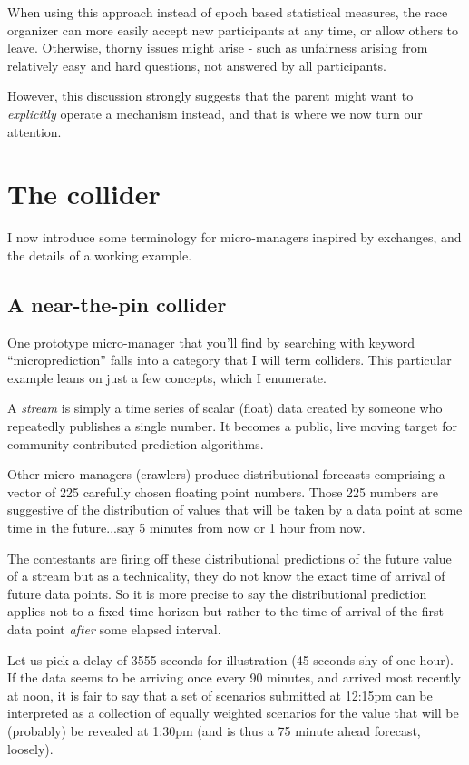 When using this approach instead of epoch based statistical measures, the race organizer can more easily accept new participants at any time, or allow others to leave. Otherwise, thorny issues might arise - such as unfairness arising from relatively easy and hard questions, not answered by all participants.  

However, this discussion strongly suggests that the parent might want to {\em explicitly} operate a mechanism instead, and that is where we now turn our attention. 

\section{The collider}

I now introduce some terminology for micro-managers inspired by exchanges, and the details of a working example.

\subsection{A near-the-pin collider}

One prototype micro-manager that you'll find by searching with keyword ``microprediction'' falls into a category that I will term colliders.
 This particular example leans on just a few concepts, which I enumerate.

A {\em stream} is simply a time series of scalar (float) data created by someone who repeatedly publishes a single number. It becomes a public, live moving target for community contributed prediction algorithms.

Other micro-managers (crawlers) produce distributional forecasts comprising a vector of 225 carefully chosen floating point numbers. Those 225 numbers are suggestive of the distribution of values that will be taken by a data point at some time in the future...say 5 minutes from now or 1 hour from now.

The contestants are firing off these distributional predictions of the future value of a stream but as a technicality, they do not know the exact time of arrival of future data points. So it is more precise to say the distributional prediction applies not to a fixed time horizon but rather to the time of arrival of the first data point {\em after} some elapsed interval.

Let us pick a delay of 3555 seconds for illustration (45 seconds shy of one hour). If the data seems to be arriving once every 90 minutes, and arrived most recently at noon, it is fair to say that a set of scenarios submitted at 12:15pm can be interpreted as a collection of equally weighted scenarios for the value that will be (probably) be revealed at 1:30pm (and is thus a 75 minute ahead forecast, loosely).

